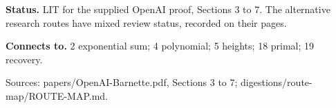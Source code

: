 \documentclass[10pt,a4paper]{amsart}
\begin{document}
\textbf{Status.} LIT for the supplied OpenAI proof, Sections 3 to 7. The alternative research routes have mixed review status, recorded on their pages.

\textbf{Connects to.} 2 exponential sum; 4 polynomial; 5 heights; 18 primal; 19 recovery.

{\footnotesize\raggedright Sources: papers/\allowbreak{}OpenAI-Barnette.pdf, Sections 3 to 7;\allowbreak{} digestions/\allowbreak{}route-map/\allowbreak{}ROUTE-MAP.md.\par}
\end{document}
